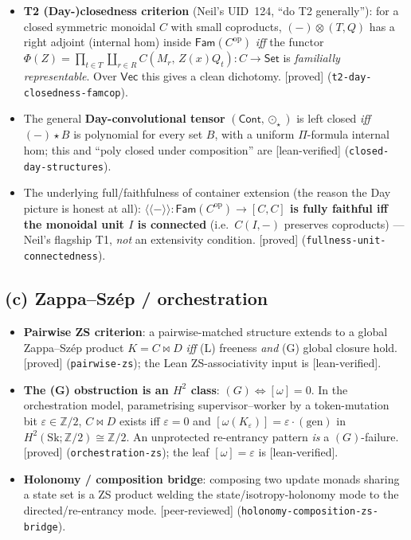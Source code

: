 \documentclass[11pt]{article}
\newcommand{\Cont}{\mathsf{Cont}}
\newcommand{\Fam}{\mathsf{Fam}}
\newcommand{\Set}{\mathsf{Set}}
\newcommand{\Vecc}{\mathsf{Vec}}
\newcommand{\reg}[1]{\texttt{#1}}
\newcommand{\grade}[1]{\textsf{[#1]}}
\begin{document}
\begin{itemize}[leftmargin=1.2em]
\item \textbf{T2 (Day-)closedness criterion} (Neil's UID~124, ``do T2 generally''): for a
closed symmetric monoidal $C$ with small coproducts, $(-)\otimes(T,Q)$ has a right adjoint
(internal hom) inside $\Fam(C^{\mathrm{op}})$ \emph{iff} the functor
$\Phi(Z)=\prod_{t\in T}\coprod_{r\in R} C(M_r,\,Z(x)Q_t):C\to\Set$ is
\emph{familially representable}. Over $\Vecc$ this gives a clean dichotomy. \grade{proved}
(\reg{t2-day-closedness-famcop}).
\item The general \textbf{Day-convolutional tensor} $(\Cont,\odot_\star)$ is left closed
\emph{iff} $(-)\star B$ is polynomial for every set $B$, with a uniform
$\Pi$-formula internal hom; this and ``poly closed under composition'' are
\grade{lean-verified} (\reg{closed-day-structures}).
\item The underlying full/faithfulness of container extension (the reason the Day picture
is honest at all): \textbf{$\langle\!\langle-\rangle\!\rangle:\Fam(C^{\mathrm{op}})\to[C,C]$
is fully faithful iff the monoidal unit $I$ is connected} (i.e.\ $C(I,-)$ preserves
coproducts) --- Neil's flagship T1, \emph{not} an extensivity condition. \grade{proved}
(\reg{fullness-unit-connectedness}).
\end{itemize}

\subsection{(c) Zappa--Szép / orchestration}\label{sec:zs}

\begin{itemize}[leftmargin=1.2em]
\item \textbf{Pairwise ZS criterion}: a pairwise-matched structure extends to a global
Zappa--Szép product $K=C\bowtie D$ \emph{iff} (L) freeness \emph{and} (G) global closure
hold. \grade{proved} (\reg{pairwise-zs}); the Lean ZS-associativity input is
\grade{lean-verified}.
\item \textbf{The (G) obstruction is an $H^2$ class}: $(G)\Leftrightarrow[\omega]=0$. In
the orchestration model, parametrising supervisor--worker by a token-mutation bit
$\varepsilon\in\mathbb{Z}/2$, $C\bowtie D$ exists iff $\varepsilon=0$ and
$[\omega(K_\varepsilon)]=\varepsilon\cdot(\text{gen})$ in $H^2(\mathrm{Sk};\mathbb{Z}/2)\cong\mathbb{Z}/2$.
An unprotected re-entrancy pattern \emph{is} a $(G)$-failure. \grade{proved}
(\reg{orchestration-zs}); the leaf $[\omega]=\varepsilon$ is \grade{lean-verified}.
\item \textbf{Holonomy / composition bridge}: composing two update monads sharing a state
set is a ZS product welding the state/isotropy-holonomy mode to the directed/re-entrancy
mode. \grade{peer-reviewed} (\reg{holonomy-composition-zs-bridge}).
\end{itemize}
\end{document}

